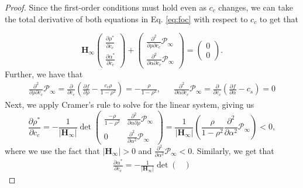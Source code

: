 \documentclass[10pt,a4paper]{amsart}
\begin{document}
\begin{proof}
Since the first-order conditions must hold even as $c_c$ changes, we can take the total derivative of both equations in Eq. \eqref{eq:foc} with respect to $c_c$ to get that

\begin{equation*}
    \mathbf{H}_\infty
    \begin{pmatrix}
        \frac{\partial \rho^*}{\partial c_c} \\
        \frac{\partial \alpha^*}{\partial c_c}
    \end{pmatrix}
    +
    \begin{pmatrix}
        \frac{\partial^2}{\partial \rho \partial c_c} \mathcal{P}_\infty \\
        \frac{\partial^2}{\partial \alpha \partial c_c} \mathcal{P}_\infty
    \end{pmatrix}
    =
    \begin{pmatrix}
        0 \\ 0
    \end{pmatrix}.
\end{equation*}
Further, we have that
\begin{align*}
    \frac{\partial^2}{\partial \rho \partial c_c} \mathcal{P}_\infty = \frac{\partial}{\partial c_c} \left( \frac{\partial f}{\partial \rho} - \frac{c_c \rho}{1-\rho^2} \right) = - \frac{\rho}{1-\rho^2}, &&
    \frac{\partial^2}{\partial \alpha \partial c_c} \mathcal{P}_\infty = \frac{\partial}{\partial c_c} \left( \frac{\partial f}{\partial \alpha} - c_s \right) = 0
\end{align*}
Next, we apply Cramer's rule to solve for the linear system, giving us
\begin{equation*}
    \frac{\partial \rho^*}{\partial c_c} = - \frac{1}{|\mathbf{H}_\infty|} \det \begin{pmatrix}
        \frac{-\rho}{1-\rho^2} & \frac{\partial^2}{\partial \alpha \partial \rho } \mathcal{P}_\infty  \\
        0 &
        \frac{\partial^2}{\partial \alpha^2 } \mathcal{P}_\infty
    \end{pmatrix} = \frac{1}{|\mathbf{H}_\infty|} \left( \frac{\rho}{1-\rho^2} \frac{\partial^2}{\partial \alpha^2} \mathcal{P}_\infty \right)< 0,
\end{equation*}
where we use the fact that $|\mathbf{H}_\infty|>0$ and $\frac{\partial^2}{\partial \alpha^2} \mathcal{P}_\infty<0$. Similarly, we get that
\begin{align*}
    \frac{\partial \alpha^*}{\partial c_c} = - \frac{1}{|\mathbf{H}_\infty|} \det \begin{pmatrix}

\end{pmatrix}
\end{align*}
\end{proof}
\end{document}

